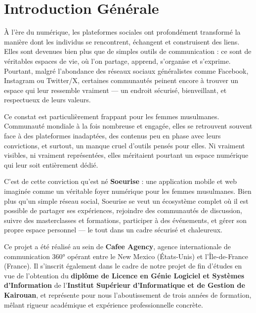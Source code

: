 \documentclass[12pt,a4paper]{report}
\begin{document}
	\chapter*{Introduction Générale}
	
	À l'ère du numérique, les plateformes sociales ont profondément transformé 
	la manière dont les individus se rencontrent, échangent et construisent des 
	liens. Elles sont devenues bien plus que de simples outils de communication : 
	ce sont de véritables espaces de vie, où l'on partage, apprend, s'organise 
	et s'exprime. Pourtant, malgré l'abondance des réseaux sociaux généralistes 
	comme Facebook, Instagram ou Twitter/X, certaines communautés peinent encore 
	à trouver un espace qui leur ressemble vraiment --- un endroit sécurisé, 
	bienveillant, et respectueux de leurs valeurs.
	
	\medskip
	
	Ce constat est particulièrement frappant pour les femmes musulmanes. 
	Communauté mondiale à la fois nombreuse et engagée, elles se retrouvent 
	souvent face à des plateformes inadaptées, des contenus peu en phase avec 
	leurs convictions, et surtout, un manque cruel d'outils pensés pour elles. 
	Ni vraiment visibles, ni vraiment représentées, elles méritaient pourtant 
	un espace numérique qui leur soit entièrement dédié.
	
	\medskip
	
	C'est de cette conviction qu'est né \textbf{Soeurise} : une application 
	mobile et web imaginée comme un véritable foyer numérique pour les femmes 
	musulmanes. Bien plus qu'un simple réseau social, Soeurise se veut un 
	écosystème complet où il est possible de partager ses expériences, rejoindre 
	des communautés de discussion, suivre des masterclasses et formations, 
	participer à des événements, et gérer son propre espace personnel --- le 
	tout dans un cadre sécurisé et chaleureux.
	
	\medskip
	
	Ce projet a été réalisé au sein de \textbf{Cafee Agency}, agence 
	internationale de communication 360° opérant entre le New Mexico 
	(États-Unis) et l'Île-de-France (France). Il s'inscrit également dans 
	le cadre de notre projet de fin d'études en vue de l'obtention du 
	\textbf{diplôme de Licence en Génie Logiciel et Systèmes d'Information} 
	de l'\textbf{Institut Supérieur d'Informatique et de Gestion de Kairouan}, 
	et représente pour nous l'aboutissement de trois années de formation, 
	mêlant rigueur académique et expérience professionnelle concrète.
	
\end{document}
